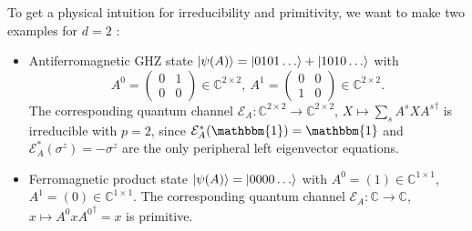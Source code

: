 \noindent To get a physical intuition for irreducibility and primitivity, we want to make two examples for $d = 2$ \cite{perez2007matrix}: 
\begin{itemize}
	\item Antiferromagnetic GHZ state $\ket{\psi(A)} = \ket{0101 \ldots} + \ket{1010 \ldots}$ with 
	\begin{equation}
		A^0 = \begin{pmatrix} 0 & 1 \\ 0 & 0 \end{pmatrix} \in \mathbb{C}^{2 \times 2}, \: A^1 = \begin{pmatrix} 0 & 0 \\ 1 & 0 \end{pmatrix} \in \mathbb{C}^{2 \times 2}.
	\end{equation}
	The corresponding quantum channel $\mathcal{E}_A: \mathbb{C}^{2 \times 2} \rightarrow \mathbb{C}^{2 \times 2}$, $X \mapsto \sum_s A^s X {A^s}^{\dagger}$ is irreducible with $p = 2$, since $\mathcal{E}_A^*(\mathbbm{1}) = \mathbbm{1}$ and $\mathcal{E}_A^*(\sigma^z) = -\sigma^z$ are the only peripheral left eigenvector equations.
	\item Ferromagnetic product state $\ket{\psi(A)} = \ket{0000 \ldots}$ with $A^0 = (1) \in \mathbb{C}^{1 \times 1}$, $A^1 = (0) \in \mathbb{C}^{1 \times 1}$. The corresponding quantum channel $\mathcal{E}_A: \mathbb{C} \rightarrow \mathbb{C}$, $x \mapsto A^0 x {A^0}^{\dagger} = x$ is primitive. 
	\end{itemize}

